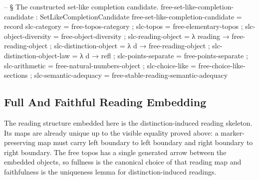 \documentclass[11pt]{article}
\begin{document}
\begin{code}
-- § The constructed set-like completion candidate.
free-set-like-completion-candidate : SetLikeCompletionCandidate
free-set-like-completion-candidate = record
  { slc-category           = free-topos-category
  ; slc-topos              = free-elementary-topos
  ; slc-object-diversity   = free-object-diversity
  ; slc-reading-object     = λ reading → free-reading-object
  ; slc-distinction-object = λ d → free-reading-object
  ; slc-distinction-object-law = λ d → refl
  ; slc-points-separate    = free-points-separate
  ; slc-arithmetic         = free-natural-numbers-object
  ; slc-choice-like        = free-choice-like-sections
  ; slc-semantic-adequacy  = free-stable-reading-semantic-adequacy
  }
\end{code}

\subsection{Full And Faithful Reading Embedding}

The reading structure embedded here is the distinction-induced reading
skeleton.  Its maps are already unique up to the visible equality proved
above: a marker-preserving map must carry left boundary to left boundary
and right boundary to right boundary.  The free topos has a single
generated arrow between the embedded objects, so fullness is the canonical
choice of that reading map and faithfulness is the uniqueness lemma for
distinction-induced readings.
\end{document}
